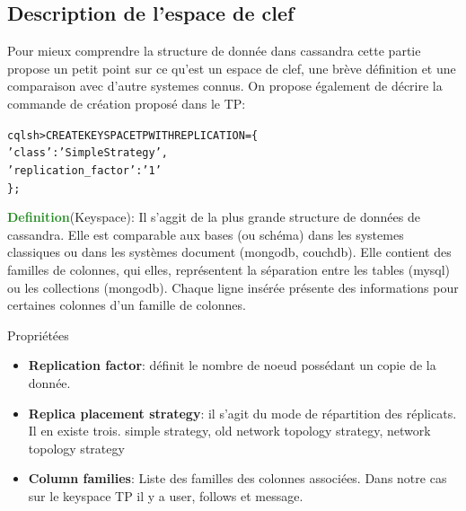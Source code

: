 \subsection{Description de l'espace de clef}
\par Pour mieux comprendre la structure de donnée dans cassandra
cette partie propose un petit point sur ce qu'est un espace de clef,
une brève définition et une comparaison avec d'autre systemes connus.
On propose également de décrire la commande de création proposé dans le TP: \newline

\begin{tt}
\begin{alltt}
cqlsh> CREATE KEYSPACE TP WITH REPLICATION = \{
\indent		'class' : 'SimpleStrategy',
\indent		'replication\_factor' : '1'
\};
\end{alltt}
\end{tt}

\textcolor{ForestGreen}{\textbf{Definition}}(Keyspace): Il s'aggit de la plus grande structure de données de cassandra. Elle est comparable aux bases (ou schéma)
dans les systemes classiques ou dans les systèmes document (mongodb, couchdb). Elle contient des familles de colonnes,  qui elles, représentent
la séparation entre les tables (mysql) ou les collections (mongodb). Chaque ligne insérée présente des informations pour certaines colonnes
d'un famille de colonnes.

\begin{block}{Propriétées}
\begin{itemize}
\item \textbf{Replication factor}: définit le nombre de noeud possédant un copie de la donnée. 
\item \textbf{Replica placement strategy}: il s'agit du mode de répartition des réplicats. Il en 
existe trois. simple strategy,  old network topology strategy, network topology strategy
\item \textbf{Column families}: Liste des familles des colonnes associées. Dans notre cas sur le keyspace
TP il y a user, follows et message.
\end{itemize}
\end{block}

